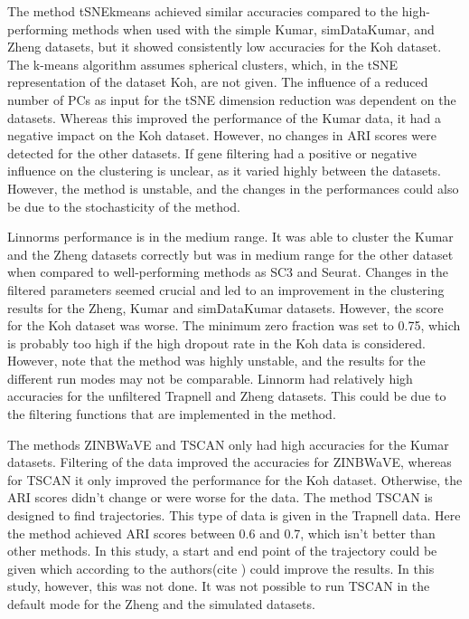 \documentclass[12pt, a4paper]{article}\usepackage[]{graphicx}\usepackage[]{color}
\begin{document}
The method tSNEkmeans achieved similar accuracies compared to the high-performing methods when used with the simple Kumar, simDataKumar, and Zheng datasets, but it showed consistently low accuracies for the Koh dataset.  The k-means algorithm assumes spherical clusters, which, in the tSNE representation of the dataset Koh, are not given.  The influence of a reduced number of PCs as input for the tSNE dimension reduction was dependent on the datasets. Whereas this improved the performance of the Kumar data, it had a negative impact on the Koh dataset. However, no changes in ARI scores were detected for the other datasets. If gene filtering had a positive or negative influence on the clustering is unclear, as it varied highly between the datasets. However, the method is unstable, and the changes in the performances could also be due to the stochasticity of the method.

Linnorms performance is in the medium range. It was able to cluster the Kumar and the Zheng datasets correctly but was in medium range for the other dataset when compared to well-performing methods as SC3 and Seurat. Changes in the filtered parameters seemed crucial and led to an improvement in the clustering results for the Zheng, Kumar and simDataKumar datasets. However, the score for the Koh dataset was worse. The minimum zero fraction was set to 0.75, which is probably too high if the high dropout rate in the Koh data is considered.  However, note that the method was highly unstable, and the results for the different run modes may not be comparable. Linnorm had relatively high accuracies for the unfiltered Trapnell and Zheng datasets. This could be due to the filtering functions that are implemented in the method.

The methods ZINBWaVE and TSCAN only had high accuracies for the Kumar datasets. Filtering of the data improved the accuracies for ZINBWaVE, whereas for TSCAN it only improved the performance for the Koh dataset. Otherwise, the ARI scores didn't change or were worse for the data. The method TSCAN is designed to find trajectories. This type of data is given in the Trapnell data. Here the method achieved ARI scores between 0.6 and 0.7, which isn't better than other methods. In this study, a start and end point of the trajectory could be given which according to the authors(cite ) could improve the results. In this study, however, this was not done. It was not possible to run TSCAN in the default mode for the Zheng and the simulated datasets. 
\end{document}
